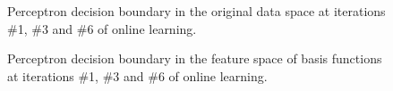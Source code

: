 \documentclass[a4]{article}
\begin{document}
\begin{figure}[h!]
\centering
\caption{Perceptron decision boundary in the original data space at iterations \#1, \#3 and \#6 of online learning.}
\label{fig:origOL}
\end{figure}
\begin{figure}[h!]
\centering
\caption{Perceptron decision boundary in the feature space of basis functions at iterations \#1, \#3 and \#6 of online learning.}
\label{fig:transOL}
\end{figure}
\end{document}
